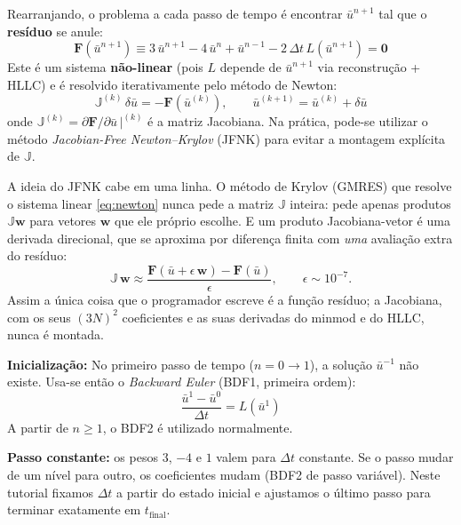 \documentclass[10pt,a4paper]{article}
\newcommand{\ub}{\bar u}
\begin{document}
Rearranjando, o problema a cada passo de tempo é encontrar $\ub^{n+1}$ tal que o \textbf{resíduo} se anule:
\begin{equation}\label{eq:residuo}
\mathbf{F}(\ub^{n+1})\equiv3\,\ub^{n+1}-4\,\ub^n+\ub^{n-1}-2\,\Delta t\,L(\ub^{n+1})=\mathbf{0}
\end{equation}
Este é um sistema \textbf{não-linear} (pois $L$ depende de $\ub^{n+1}$ via reconstrução + HLLC) e é resolvido iterativamente pelo método de Newton:
\begin{equation}\label{eq:newton}
\mathbb{J}^{(k)}\,\delta\ub=-\mathbf{F}(\ub^{(k)}),\qquad \ub^{(k+1)}=\ub^{(k)}+\delta\ub
\end{equation}
onde $\mathbb{J}^{(k)}=\partial\mathbf{F}/\partial\ub\,\big|^{(k)}$ é a matriz Jacobiana. Na prática, pode-se utilizar o método \emph{Jacobian-Free Newton--Krylov} (JFNK) para evitar a montagem explícita de $\mathbb{J}$.

A ideia do JFNK cabe em uma linha. O método de Krylov (GMRES) que resolve o sistema linear \eqref{eq:newton} nunca pede a matriz $\mathbb{J}$ inteira: pede apenas produtos $\mathbb{J}\mathbf{w}$ para vetores $\mathbf{w}$ que ele próprio escolhe. E um produto Jacobiana-vetor é uma derivada direcional, que se aproxima por diferença finita com \emph{uma} avaliação extra do resíduo:
\begin{equation}\label{eq:jfnk}
\mathbb{J}\,\mathbf{w}\approx\frac{\mathbf{F}(\ub+\epsilon\,\mathbf{w})-\mathbf{F}(\ub)}{\epsilon},\qquad \epsilon\sim10^{-7}.
\end{equation}
Assim a única coisa que o programador escreve é a função resíduo; a Jacobiana, com os seus $(3N)^2$ coeficientes e as suas derivadas do minmod e do HLLC, nunca é montada.

\begin{atencao}
\textbf{Inicialização:} No primeiro passo de tempo ($n=0\to1$), a solução $\ub^{-1}$ não existe. Usa-se então o \emph{Backward Euler} (BDF1, primeira ordem):
\[
\frac{\ub^1-\ub^0}{\Delta t}=L(\ub^1)
\]
A partir de $n\ge1$, o BDF2 é utilizado normalmente.

\textbf{Passo constante:} os pesos $3$, $-4$ e $1$ valem para $\Delta t$ constante. Se o passo mudar de um nível para outro, os coeficientes mudam (BDF2 de passo variável). Neste tutorial fixamos $\Delta t$ a partir do estado inicial e ajustamos o último passo para terminar exatamente em $t_{\text{final}}$.
\end{atencao}
\end{document}

